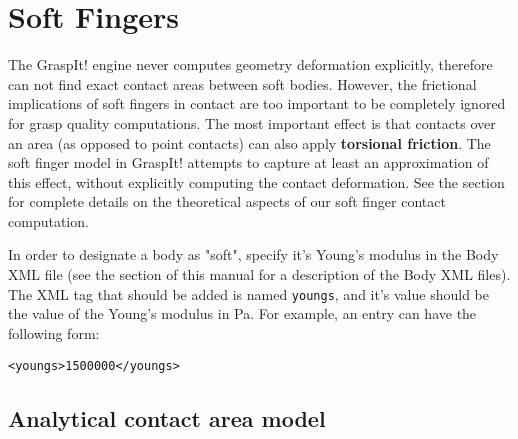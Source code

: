 \section{Soft Fingers}
\label{sec:softFingers}


The GraspIt! engine never computes geometry deformation explicitly,
therefore can not find exact contact areas between soft
bodies. However, the frictional implications of soft fingers in
contact are too important to be completely ignored for grasp quality
computations. The most important effect is that contacts over an area
(as opposed to point contacts) can also apply \textbf{torsional
  friction}. The soft finger model in GraspIt! attempts to capture at
least an approximation of this effect, without explicitly computing
the contact deformation. See the 
section for complete details on the theoretical aspects of our soft
finger contact computation.

In order to designate a body as "soft", specify it's Young's modulus
in the Body XML file (see the 
section of this manual for a description of the Body XML files). The
XML tag that should be added is named \texttt{youngs}, and it's value
should be the value of the Young's modulus in Pa. For example, an
entry can have the following form:

\texttt{<youngs>1500000</youngs>}

\subsection{Analytical contact area model}

